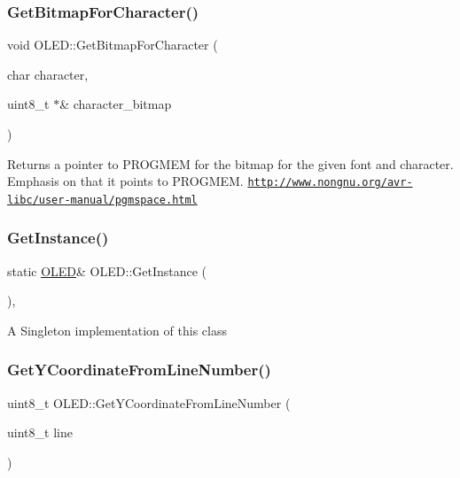 \subsubsection{\texorpdfstring{Get\+Bitmap\+For\+Character()}{GetBitmapForCharacter()}}
{\footnotesize\ttfamily void O\+L\+E\+D\+::\+Get\+Bitmap\+For\+Character (\begin{DoxyParamCaption}\item[{char}]{character,  }\item[{uint8\+\_\+t $\ast$\&}]{character\+\_\+bitmap }\end{DoxyParamCaption})}

Returns a pointer to P\+R\+O\+G\+M\+EM for the bitmap for the given font and character. Emphasis on that it points to P\+R\+O\+G\+M\+EM. \href{http://www.nongnu.org/avr-libc/user-manual/pgmspace.html}{\tt http\+://www.\+nongnu.\+org/avr-\/libc/user-\/manual/pgmspace.\+html} \hypertarget{class_o_l_e_d_a7b261492679b5e67d346e97ed575332e}{}\label{class_o_l_e_d_a7b261492679b5e67d346e97ed575332e} 
\subsubsection{\texorpdfstring{Get\+Instance()}{GetInstance()}}
{\footnotesize\ttfamily static \hyperlink{class_o_l_e_d}{O\+L\+ED}\& O\+L\+E\+D\+::\+Get\+Instance (\begin{DoxyParamCaption}{ }\end{DoxyParamCaption})\hspace{0.3cm}{\ttfamily [inline]}, {\ttfamily [static]}}

A Singleton implementation of this class \hypertarget{class_o_l_e_d_a5b6d41d5d699998f54ea6e3b6562ac5b}{}\label{class_o_l_e_d_a5b6d41d5d699998f54ea6e3b6562ac5b} 
\subsubsection{\texorpdfstring{Get\+Y\+Coordinate\+From\+Line\+Number()}{GetYCoordinateFromLineNumber()}}
{\footnotesize\ttfamily uint8\+\_\+t O\+L\+E\+D\+::\+Get\+Y\+Coordinate\+From\+Line\+Number (\begin{DoxyParamCaption}\item[{uint8\+\_\+t}]{line }\end{DoxyParamCaption})}


